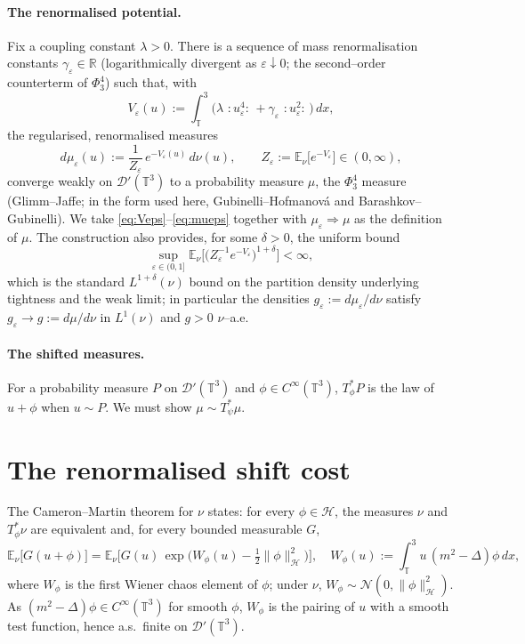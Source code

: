 \documentclass[12pt]{article}
\theoremstyle{definition}
\newcommand{\T}{\mathbb{T}^3}
\newcommand{\R}{\mathbb{R}}
\newcommand{\E}{\mathbb{E}}
\newcommand{\D}{\mathcal{D}'(\T)}
\newcommand{\Wick}[1]{\,{:}#1{:}\,}
\begin{document}
\paragraph{The renormalised potential.}
Fix a coupling constant $\lambda>0$. There is a sequence of mass renormalisation
constants $\gamma_\varepsilon\in\R$ (logarithmically divergent as $\varepsilon\downarrow0$;
the second--order counterterm of $\Phi^4_3$) such that, with
\begin{equation}\label{eq:Veps}
  V_\varepsilon(u):=\int_\T\Big(\lambda\,\Wick{u_\varepsilon^4}
     +\gamma_\varepsilon\,\Wick{u_\varepsilon^2}\Big)\,dx ,
\end{equation}
the regularised, renormalised measures
\begin{equation}\label{eq:mueps}
  d\mu_\varepsilon(u):=\frac{1}{Z_\varepsilon}\,e^{-V_\varepsilon(u)}\,d\nu(u),
  \qquad Z_\varepsilon:=\E_\nu\!\big[e^{-V_\varepsilon}\big]\in(0,\infty),
\end{equation}
converge weakly on $\D$ to a probability measure $\mu$, the $\Phi^4_3$ measure
(Glimm--Jaffe; in the form used here, Gubinelli--Hofmanov\'a and Barashkov--Gubinelli).
We take \eqref{eq:Veps}--\eqref{eq:mueps} together with $\mu_\varepsilon\Rightarrow\mu$
as the definition of $\mu$. The construction also provides, for some $\delta>0$, the
uniform bound
\begin{equation}\label{eq:Lp}
  \sup_{\varepsilon\in(0,1]}\E_\nu\!\Big[\big(Z_\varepsilon^{-1}e^{-V_\varepsilon}\big)^{1+\delta}\Big]<\infty ,
\end{equation}
which is the standard $L^{1+\delta}(\nu)$ bound on the partition density underlying
tightness and the weak limit; in particular the densities $g_\varepsilon:=d\mu_\varepsilon/d\nu$
satisfy $g_\varepsilon\to g:=d\mu/d\nu$ in $L^1(\nu)$ and $g>0$ $\nu$--a.e.

\paragraph{The shifted measures.}
For a probability measure $P$ on $\D$ and $\phi\in C^\infty(\T)$, $T_\phi^{*}P$ is the law
of $u+\phi$ when $u\sim P$. We must show $\mu\sim T_\psi^{*}\mu$.

\section{The renormalised shift cost}

The Cameron--Martin theorem for $\nu$ states: for every $\phi\in\mathcal H$, the measures
$\nu$ and $T_\phi^{*}\nu$ are equivalent and, for every bounded measurable $G$,
\begin{equation}\label{eq:CM}
  \E_\nu\!\big[G(u+\phi)\big]
  =\E_\nu\!\Big[G(u)\,\exp\!\big(W_\phi(u)-\tfrac12\|\phi\|_{\mathcal H}^2\big)\Big],
  \quad
  W_\phi(u):=\int_\T u\,(m^2-\Delta)\phi\,dx ,
\end{equation}
where $W_\phi$ is the first Wiener chaos element of $\phi$; under $\nu$,
$W_\phi\sim\mathcal N(0,\|\phi\|_{\mathcal H}^2)$. As $(m^2-\Delta)\phi\in C^\infty(\T)$
for smooth $\phi$, $W_\phi$ is the pairing of $u$ with a smooth test function, hence a.s.\
finite on $\D$.
\end{document}
